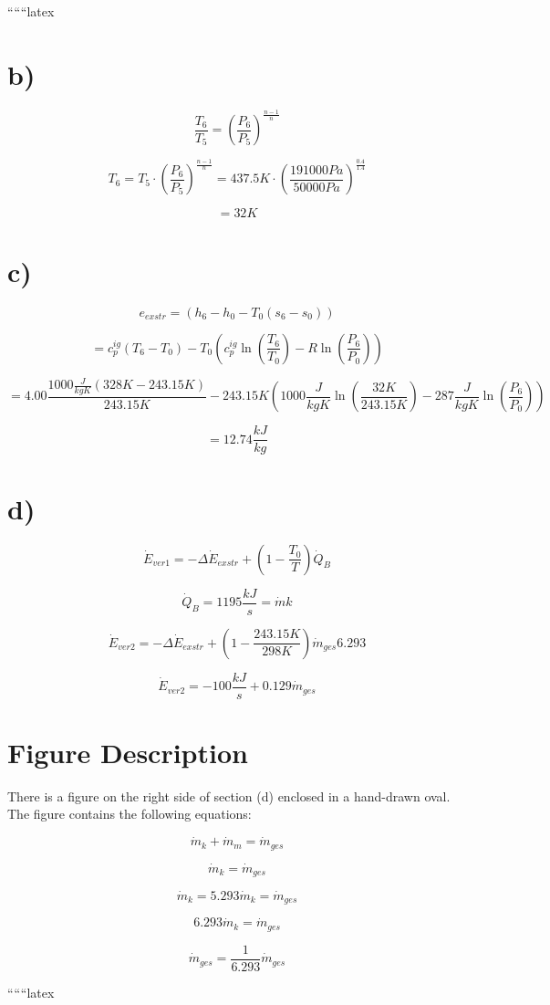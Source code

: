 ``````latex


\section*{b)}

\[
\frac{T_6}{T_5} = \left( \frac{P_6}{P_5} \right)^{\frac{n-1}{n}}
\]

\[
T_6 = T_5 \cdot \left( \frac{P_6}{P_5} \right)^{\frac{n-1}{n}} = 437.5K \cdot \left( \frac{191000Pa}{50000Pa} \right)^{\frac{0.4}{1.4}}
\]

\[
= 32K
\]

\section*{c)}

\[
e_{exstr} = (h_6 - h_0 - T_0(s_6 - s_0))
\]

\[
= c_p^{ig}(T_6 - T_0) - T_0 \left( c_p^{ig} \ln \left( \frac{T_6}{T_0} \right) - R \ln \left( \frac{P_6}{P_0} \right) \right)
\]

\[
= 4.00 \frac{1000 \frac{J}{kgK} (328K - 243.15K)}{243.15K} - 243.15K \left( 1000 \frac{J}{kgK} \ln \left( \frac{32K}{243.15K} \right) - 287 \frac{J}{kgK} \ln \left( \frac{P_6}{P_0} \right) \right)
\]

\[
= 12.74 \frac{kJ}{kg}
\]

\section*{d)}

\[
\dot{E}_{ver1} = -\Delta \dot{E}_{exstr} + \left( 1 - \frac{T_0}{T} \right) \dot{Q}_B
\]

\[
\dot{Q}_B = 1195 \frac{kJ}{s} = \dot{m} k
\]

\[
\dot{E}_{ver2} = -\Delta \dot{E}_{exstr} + \left( 1 - \frac{243.15K}{298K} \right) \dot{m}_{ges} 6.293
\]

\[
\dot{E}_{ver2} = -100 \frac{kJ}{s} + 0.129 \dot{m}_{ges}
\]

\section*{Figure Description}

There is a figure on the right side of section (d) enclosed in a hand-drawn oval. The figure contains the following equations:

\[
\dot{m}_k + \dot{m}_m = \dot{m}_{ges}
\]

\[
\dot{m}_k = \dot{m}_{ges}
\]

\[
\dot{m}_k = 5.293 \dot{m}_k = \dot{m}_{ges}
\]

\[
6.293 \dot{m}_k = \dot{m}_{ges}
\]

\[
\dot{m}_{ges} = \frac{1}{6.293} \dot{m}_{ges}
\]

``````latex


